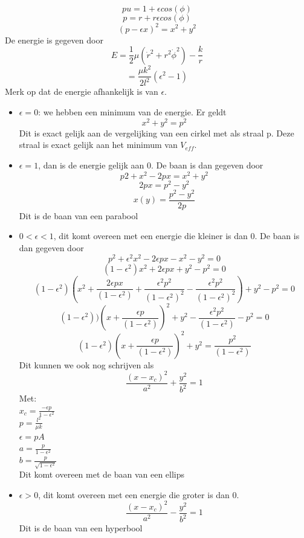 $$pu=1+\epsilon cos(\phi)$$
$$p=r+r\epsilon cos(\phi)$$
$$(p-\epsilon x)^{2}=x^{2}+y^{2}$$
De energie is gegeven door
$$E=\frac{1}{2}\mu(\dot{r}^{2}+r^{2}\dot{\phi}^{2})-\frac{k}{r}$$
$$=\frac{\mu k^{2}}{2l^{2}}(\epsilon^{2}-1)$$
Merk op dat de energie afhankelijk is van $\epsilon$. 
\begin{itemize}
\item  $\epsilon=0$: we hebben een minimum van de energie. Er geldt
$$x^{2}+y^{2}=p^{2}$$
Dit is exact gelijk aan de vergelijking van een cirkel met als straal p. Deze straal is exact gelijk aan het minimum van $V_{eff}$. 
\item $\epsilon=1$, dan is de energie gelijk aan 0. De baan is dan gegeven door
$$p{2}+x^{2}-2px=x^{2}+y^{2}$$
$$2px=p^{2}-y^{2}$$
$$x(y)=\frac{p^{2}-y^{2}}{2p}$$
Dit is de baan van een parabool
\item $0<\epsilon<1$, dit komt overeen met een energie die kleiner is dan 0. De baan is dan gegeven door
$$p^{2}+\epsilon^{2}x^{2}-2\epsilon px-x^{2}-y^{2}=0$$
$$(1-\epsilon^{2})x^{2}+2\epsilon px+y^{2}-p^{2}=0$$
$$(1-\epsilon^{2})(x^{2}+\frac{2\epsilon px}{(1-\epsilon^{2})}+\frac{\epsilon^{2}p^{2}}{(1-\epsilon^{2})^{2}}-\frac{\epsilon^{2}p^{2}}{(1-\epsilon^{2})^{2}})+y^{2}-p^{2}=0$$
$$(1-\epsilon^{2}))(x+\frac{\epsilon p}{(1-\epsilon^{2})})^{2}+y^{2}-\frac{\epsilon^{2}p^{2}}{(1-\epsilon^{2})}-p^{2}=0$$
$$(1-\epsilon^{2})(x+\frac{\epsilon p}{(1-\epsilon^{2})})^{2}+y^{2}=\frac{p^{2}}{(1-\epsilon^{2})}$$
Dit kunnen we ook nog schrijven als
$$\frac{(x-x_{c})^{2}}{a^{2}}+\frac{y^{2}}{b^{2}}=1$$
Met: \\
$x_{c}=\frac{-\epsilon p}{1-\epsilon^{2}}$ \\
$p=\frac{l^{2}}{\mu k}$\\
$\epsilon = pA$\\
$a=\frac{p}{1-\epsilon^{2}}$\\
$b=\frac{p}{\sqrt{1-\epsilon^{2}}}$\\
Dit komt overeen met de baan van een ellips
\item $\epsilon > 0$, dit komt overeen met een energie die groter is dan 0. 
$$\frac{(x-x_{c})^{2}}{a^{2}}-\frac{y^{2}}{b^{2}}=1$$
Dit is de baan van een hyperbool
\end{itemize}
